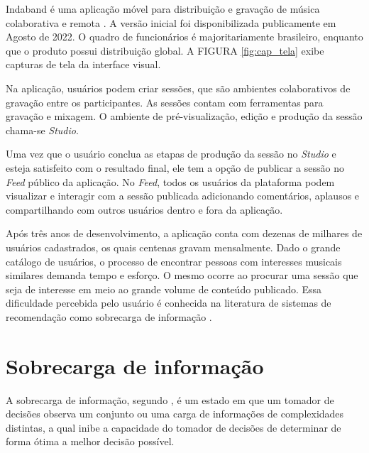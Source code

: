 Indaband é uma aplicação móvel para distribuição e gravação de música
colaborativa e remota \cite{indaband}. A versão inicial foi disponibilizada
publicamente em Agosto de 2022. O quadro de funcionários é majoritariamente
brasileiro, enquanto que o produto possui distribuição global. A FIGURA
\ref{fig:cap_tela} exibe capturas de tela da interface visual.

Na aplicação, usuários podem criar sessões, que são ambientes colaborativos de
gravação entre os participantes. As sessões contam com ferramentas para gravação
e mixagem. O ambiente de pré-visualização, edição e produção da sessão chama-se
\textit{Studio}.

Uma vez que o usuário conclua as etapas de produção da sessão no \textit{Studio}
e esteja satisfeito com o resultado final, ele tem a opção de publicar a sessão
no \textit{Feed} público da aplicação. No \textit{Feed}, todos os usuários da
plataforma podem visualizar e interagir com a sessão publicada adicionando
comentários, aplausos e compartilhando com outros usuários dentro e fora da
aplicação.

Após três anos de desenvolvimento, a aplicação conta com dezenas de milhares de
usuários cadastrados, os quais centenas gravam mensalmente. Dado o grande
catálogo de usuários, o processo de encontrar pessoas com interesses musicais
similares demanda tempo e esforço. O mesmo ocorre ao procurar uma sessão que
seja de interesse em meio ao grande volume de conteúdo publicado. Essa
dificuldade percebida pelo usuário é conhecida na literatura de sistemas de
recomendação como sobrecarga de informação \cite{roetzel2019information}.

\section{Sobrecarga de informação}

A sobrecarga de informação, segundo \citet{roetzel2019information}, é um estado em que um tomador de decisões observa um
conjunto ou uma carga de informações de complexidades distintas, a qual inibe a
capacidade do tomador de decisões de determinar de forma ótima a melhor decisão
possível.

